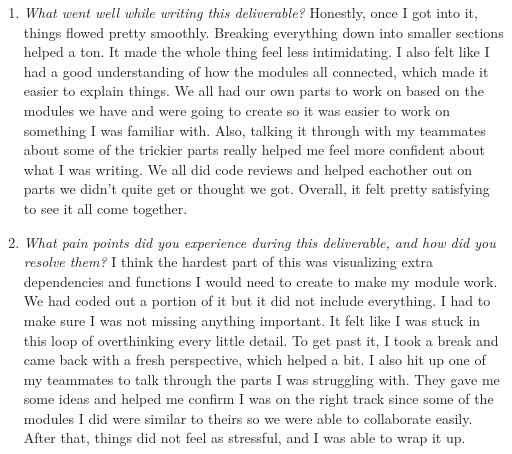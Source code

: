 \documentclass[12pt, titlepage]{article}
\begin{document}
\begin{enumerate}
  \item \textit{What went well while writing this deliverable? }
  Honestly, once I got into it, things flowed pretty smoothly. Breaking everything down into 
  smaller sections helped a ton. It made the whole thing feel less intimidating. I also felt like 
  I had a good understanding of how the modules all connected, which made it easier to explain things.
  We all had our own parts to work on based on the modules we have and were going to create so it was easier to 
  work on something I was familiar with. Also, talking it through with my teammates about some of the trickier 
  parts really helped me feel more confident about what I was writing. We all did code reviews and helped eachother out on
  parts we didn't quite get or thought we got. Overall, it felt pretty satisfying to see it all come together.
  
  \item \textit{What pain points did you experience during this deliverable, and how did you resolve them?}
  I think the hardest part of this was visualizing extra dependencies and functions I would need to create to make my 
  module work. We had coded out a portion of it but it did not include everything. I had to make sure I was not missing 
  anything important. It felt like I was stuck in this loop of overthinking every little detail. To get past it, I took a 
  break and came back with a fresh perspective, which helped a bit. I also hit up one of my teammates to talk through the 
  parts I was struggling with. They gave me some ideas and helped me confirm I was on the right track since some of the 
  modules I did were similar to theirs so we were able to collaborate easily. After that, things did not feel as stressful, 
  and I was able to wrap it up.
  
\end{enumerate}
\end{document}
